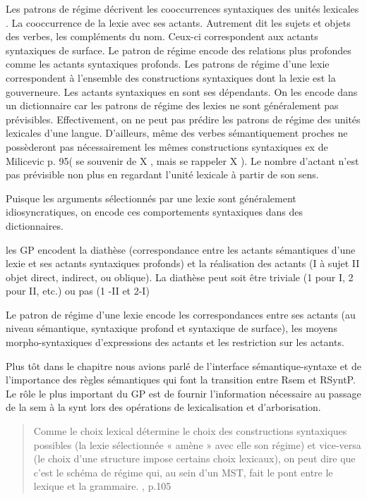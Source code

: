 Les patrons de régime décrivent les cooccurrences syntaxiques des unités lexicales \citep{MilicevicSchemaregimepont2009}. La cooccurrence de la lexie avec ses actants. Autrement dit les sujets et objets des verbes, les compléments du nom. Ceux-ci correspondent aux actants syntaxiques de surface. Le patron de régime encode des relations plus profondes comme les actants syntaxiques profonds. Les patrons de régime d'une lexie correspondent à l'ensemble des constructions syntaxiques dont la lexie est la gouverneure. Les actants syntaxiques en sont ses dépendants. On les encode dans un dictionnaire car les patrons de régime des lexies ne sont généralement pas prévisibles. Effectivement, on ne peut pas prédire les patrons de régime des unités lexicales d'une langue. D'ailleurs, même des verbes sémantiquement proches ne possèderont pas nécessairement les mêmes constructions syntaxiques ex de Milicevic p. 95( se souvenir de X , mais se rappeler X ). Le nombre d'actant n'est pas prévisible non plus en regardant l'unité lexicale à partir de son sens. 

Puisque les arguments sélectionnés par une lexie sont généralement idiosyncratiques, on encode ces comportements syntaxiques dans des dictionnaires.

les GP encodent la diathèse (correspondance entre les actants sémantiques d'une lexie et ses actants syntaxiques profonds) et la réalisation des actants (I à sujet II objet direct, indirect, ou oblique). La diathèse peut soit être triviale (1 pour I, 2 pour II, etc.) ou pas (1 -II et 2-I)

Le patron de régime d'une lexie encode les correspondances entre ses actants (au niveau sémantique, syntaxique profond et syntaxique de surface), les moyens morpho-syntaxiques d'expressions des actants et les restriction sur les actants.

Plus tôt dans le chapitre nous avions parlé de l'interface sémantique-syntaxe et de l'importance des règles sémantiques qui font la transition entre Rsem et RSyntP. Le rôle le plus important du GP est de fournir l'information nécessaire au passage de la sem à la synt lors des opérations de lexicalisation et d’arborisation. 

\begin{quotation}{Comme le choix lexical détermine le choix des constructions syntaxiques possibles (la lexie sélectionnée « amène » avec elle son régime) et vice-versa (le choix d’une structure impose certains choix lexicaux), on peut dire que c’est le schéma de régime qui, au sein d’un MST, fait le pont entre le lexique et la grammaire. \citep{MilicevicSchemaregimepont2009}, p.105}
\end{quotation}

